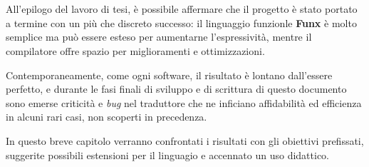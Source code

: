 \chapter{}
\label{chap:6-conclusions}

All'epilogo del lavoro di tesi, è possibile affermare che il progetto è stato portato a termine con un più che discreto successo:
il linguaggio funzionle \textbf{Funx} è molto semplice ma può essere esteso per aumentarne l'espressività,
mentre il compilatore offre spazio per miglioramenti e ottimizzazioni.


Contemporaneamente, come ogni software, il risultato è lontano dall'essere perfetto,
e durante le fasi finali di sviluppo e di scrittura di questo documento sono emerse criticità e \textit{bug}
nel traduttore che ne inficiano affidabilità ed efficienza in alcuni rari casi, non scoperti in precedenza.


In questo breve capitolo verranno confrontati i risultati con gli obiettivi prefissati,
suggerite possibili estensioni per il linguagio e accennato un uso didattico.



\newpage




